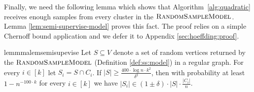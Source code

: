 \documentclass[letterpaper,11pt]{article}
\newcommand{\rsm}{\textsc{RandomSampleModel}}
\theoremstyle{plain}
\theoremstyle{definition}
\theoremstyle{remark}
\begin{document}
Finally, we need the following lemma which shows that Algorithm~\ref{alg:quadratic} receives enough samples from 
every cluster in the $\rsm$. Lemma \ref{lem:semi-supervise-model} proves this 
fact. The proof relies on a simple Chernoff bound application and we defer it to 
Appendix \ref{sec:hoeffding:proof}.

\begin{restatable}{lemmma}{lemsemisupevise} \label{lem:semi-supervise-model}
Let $S\subseteq V$ denote a set of random vertices returned by the $\rsm$ (Definition \ref{def:ss:model}) in a regular graph. For every $i\in [k]$ let $S_i=S\cap C_i$. If $|S| \geq \frac{400\cdot \log n\cdot k^2}{\delta^2}$, then with probability at least $1-n^{-100\cdot k}$ for every $i\in[k]$ we have $|S_i|\in (1\pm \delta)\cdot |S|\cdot \frac{|C_i|}{n}$.
\end{restatable}
\end{document}
